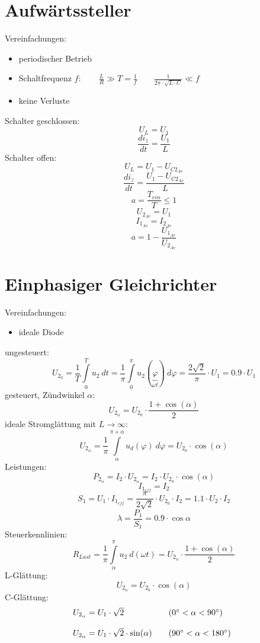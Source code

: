 \section{Aufwärtssteller}
Vereinfachungen: 
\begin{itemize}
  \item periodischer Betrieb
  \item Schaltfrequenz $f: \qquad\frac{L}{R} \gg T = \frac{1}{f} 
        \qquad \frac{1}{2 \pi \cdot \sqrt{L \cdot C}} \ll f$
  \item keine Verluste
\end{itemize}
Schalter geschlossen: 
\[ U_L = U_1 \]
\[ \frac{d i_z}{d t} = \frac{U_1}{L} \]
Schalter offen: 
\[ U_L = U_1 - U_{C2_{Av}} \]
\[ \frac{d i_z}{d t} = \frac{U_1 - U_{C2_{Av}}}{L} \]
\[ a = \frac{T_{ein}}{T} \leq 1 \]
\[ U_{2_{Av}} = U_1 \]
\[ I_{1_{Av}} = I_{2_{Av}} \]
\[ a = 1 - \frac{U_{1_{Av}}}{U_{2_{Av}}} \]

\section{Einphasiger Gleichrichter}
Vereinfachungen: 
\begin{itemize}
  \item ideale Diode
\end{itemize}
ungesteuert: 
\[ U_{2_0} = \frac{1}{T} \int\limits_0^T u_2 ~dt = \frac{1}{\pi} 
\int\limits_0^\pi u_2 (\underbrace{\varphi}_{\omega t}) ~ d\varphi 
= \frac{2 \sqrt{2}}{\pi} \cdot U_1 = 0.9 \cdot U_1 \]
gesteuert, Zündwinkel $\alpha$:
\[ U_{2_\alpha} = U_{2_0} \cdot \frac{1 + \cos(\alpha)}{2} \]
ideale Stromglättung mit $L \to \infty$: 
\[ U_{2_\alpha} = \frac{1}{\pi} \int\limits_\alpha^{\pi + \alpha} u_d(\varphi) 
~ d \varphi = U_{2_0} \cdot \cos(\alpha) \]
Leistungen: 
\[ P_{2_\alpha} = I_2 \cdot U_{2_\alpha} 
= I_2 \cdot U_{2_0} \cdot \cos(\alpha) \]
\[ I_{1_{eff}} = I_2 \]
\[ S_1 = U_1 \cdot I_{1_{eff}} 
= \frac{\pi}{2 \sqrt{2}} \cdot U_{2_0} \cdot I_2 = 1.1 \cdot U_2 \cdot I_2 \]
\[ \lambda = \frac{P_1}{S_1} = 0.9 \cdot \cos{\alpha} \]
Steuerkennlinien: 
\[ R_{Last} = \frac{1}{\pi} \int\limits_\alpha^\pi u_2 ~ d(\omega t) 
= U_{2_\alpha} \cdot \frac{1 + \cos(\alpha)}{2} \]
L-Glättung: 
\[ U_{2_\alpha} = U_{2_0} \cdot \cos(\alpha) \]
C-Glättung: 
\[ \begin{array}{@{}l@{}l}
U_{2_\alpha} = U_1 \cdot \sqrt{2} & \qquad (0^\circ < \alpha < 90^\circ) \\\\
U_{2_\alpha} = U_1 \cdot \sqrt{2} \cdot \sin(\alpha) 
& \qquad (90^\circ < \alpha < 180^\circ) \\
\end{array} \]

